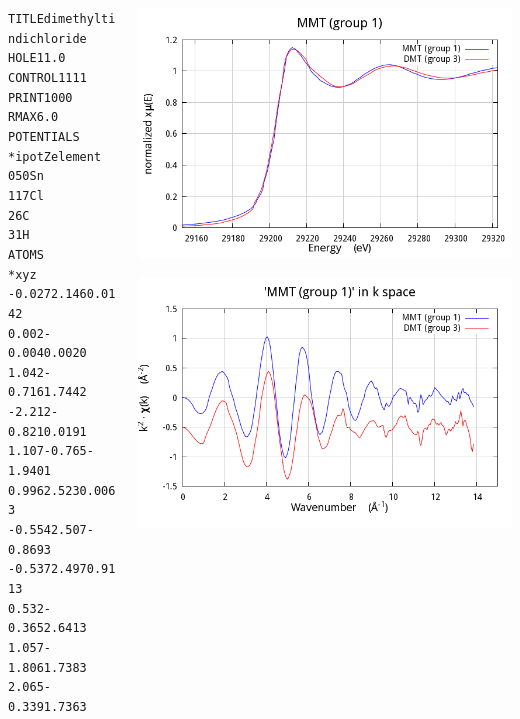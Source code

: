 \documentclass[10pt, xcolor=x11names, compress]{beamer}
\begin{document}
\begin{frame}[fragile,label=methyltin]
\begin{columns}[T]
\begin{column}{0.6\linewidth}
      \begin{center}
        \begin{minipage}{0.6\linewidth}
          \begin{alltt}
\tiny
 {\color{Green4}TITLE     dimethyltin dichloride}
 {\color{SteelBlue4}HOLE}      1      1.0
 {\color{SteelBlue4}CONTROL}   1      1     1     1
 {\color{SteelBlue4}PRINT}     1      0     0     0
 {\color{SteelBlue4}RMAX}      6.0
 {\color{Purple3}POTENTIALS}
 {\color{Blue4}*    ipot   Z  element}
        0   50   Sn        
        1   17   Cl
        2    6   C
        3    1   H
 {\color{Purple3}ATOMS}
 {\color{Blue4}*   x       y       z}
   -0.027   2.146   0.014  2
    0.002  -0.004   0.002  0
    1.042  -0.716   1.744  2
   -2.212  -0.821   0.019  1
    1.107  -0.765  -1.940  1
    0.996   2.523   0.006  3
   -0.554   2.507  -0.869  3
   -0.537   2.497   0.911  3
    0.532  -0.365   2.641  3
    1.057  -1.806   1.738  3
    2.065  -0.339   1.736  3
          \end{alltt}
        \end{minipage}
      \end{center}
    \end{column}
    \begin{column}{0.4\linewidth}
      \includegraphics[width=0.85\linewidth]{mkw/data_xanes.png}      

      \includegraphics[width=0.85\linewidth]{mkw/data_chik.png}      


\end{column}
\end{columns}
\end{frame}
\end{document}
